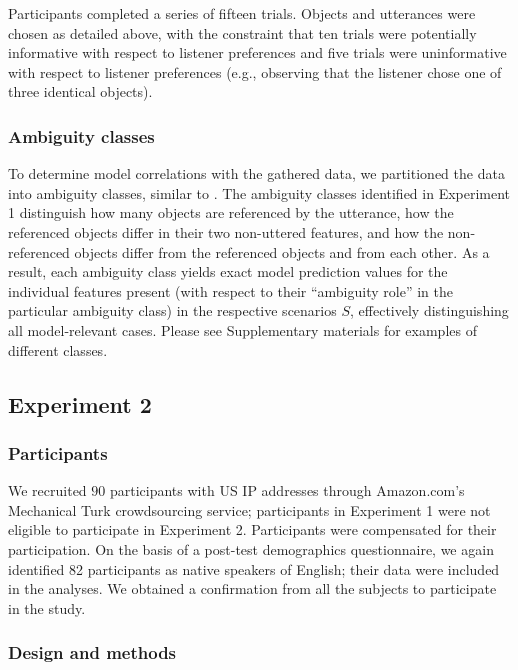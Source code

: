 \documentclass[10pt,a4paper]{article}
\begin{document}
Participants completed a series of fifteen trials. Objects and utterances were chosen as detailed above, with the constraint that ten trials were potentially informative with respect to listener preferences and five trials were uninformative with respect to listener preferences (e.g., observing that the listener chose one of three identical objects). 

\subsubsection*{Ambiguity classes}

To determine model correlations with the gathered data, we partitioned the data into ambiguity classes, similar to . 
The ambiguity classes identified in Experiment 1 distinguish how many objects are referenced by the utterance, how the referenced objects differ in their two non-uttered features, and how the non-referenced objects differ from the referenced objects and from each other.
As a result, each ambiguity class yields exact model prediction values for the individual features present (with respect to their ``ambiguity role'' in the particular ambiguity class) in the respective scenarios $S$, effectively distinguishing all model-relevant cases. Please see Supplementary materials for examples of different classes.



\subsection*{Experiment 2}

\subsubsection*{Participants}

We recruited $90$ participants with US IP addresses through Amazon.com's Mechanical Turk crowdsourcing service; participants in Experiment 1 were not eligible to participate in Experiment 2. Participants were compensated for their participation. On the basis of a post-test demographics questionnaire, we again identified 82 participants as native speakers of English; their data were included in the analyses. We obtained a confirmation from all the subjects to participate in the study.

\subsubsection*{Design and methods}
\end{document}
